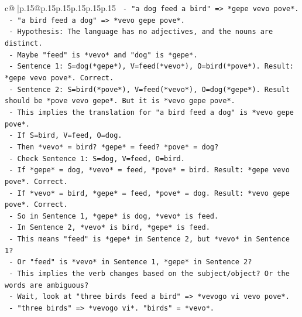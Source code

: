 \documentclass{article}
\begin{document}
{\begin{supertabular}{c@{$\;$}|p{.15\linewidth}@{}p{.15\linewidth}p{.15\linewidth}p{.15\linewidth}p{.15\linewidth}p{.15\linewidth}}
{{{\texttt{                    {-}   "a dog feed a bird" => *gepe vevo pove*.} \\
\texttt{                    {-}   "a bird feed a dog" => *vevo gepe pove*.} \\
\texttt{                    {-}   Hypothesis: The language has no adjectives, and the nouns are distinct.} \\
\texttt{                    {-}   Maybe "feed" is *vevo* and "dog" is *gepe*.} \\
\texttt{                    {-}   Sentence 1: S=dog(*gepe*), V=feed(*vevo*), O=bird(*pove*). Result: *gepe vevo pove*. Correct.} \\
\texttt{                    {-}   Sentence 2: S=bird(*pove*), V=feed(*vevo*), O=dog(*gepe*). Result should be *pove vevo gepe*. But it is *vevo gepe pove*.} \\
\texttt{                    {-}   This implies the translation for "a bird feed a dog" is *vevo gepe pove*.} \\
\texttt{                    {-}   If S=bird, V=feed, O=dog.} \\
\texttt{                    {-}   Then *vevo* = bird? *gepe* = feed? *pove* = dog?} \\
\texttt{                    {-}   Check Sentence 1: S=dog, V=feed, O=bird.} \\
\texttt{                    {-}   If *gepe* = dog, *vevo* = feed, *pove* = bird. Result: *gepe vevo pove*. Correct.} \\
\texttt{                    {-}   If *vevo* = bird, *gepe* = feed, *pove* = dog. Result: *vevo gepe pove*. Correct.} \\
\texttt{                    {-}   So in Sentence 1, *gepe* is dog, *vevo* is feed.} \\
\texttt{                    {-}   In Sentence 2, *vevo* is bird, *gepe* is feed.} \\
\texttt{                    {-}   This means "feed" is *gepe* in Sentence 2, but *vevo* in Sentence 1?} \\
\texttt{                    {-}   Or "feed" is *vevo* in Sentence 1, *gepe* in Sentence 2?} \\
\texttt{                    {-}   This implies the verb changes based on the subject/object? Or the words are ambiguous?} \\
\texttt{                    {-}   Wait, look at "three birds feed a bird" => *vevogo vi vevo pove*.} \\
\texttt{                        {-}   "three birds" => *vevogo vi*. "birds" = *vevo*.} \\
}}}
\end{supertabular}}
\end{document}
